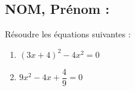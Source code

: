 \documentclass[a4paper,11pt,exos]{nsi}
\begin{document}
\subsection*{NOM, Prénom : \dotfill} 


\maketitle




\begin{exercice}
    Résoudre les équations suivantes :
    \begin{multicols}{2}
        \begin{enumerate}
            \item $(3x+4)^2-4x^2=0$
	        \item $9x^2-4x+\dfrac{4}{9}=0$
        \end{enumerate}
    \end{multicols}
    
\end{exercice}

\end{document}
